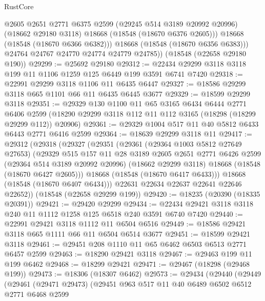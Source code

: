 \begin{lexlean}{RustCore}
\begin{coremodule}
              @2605
              @2651
              @2771
              @6375
              @2599
              (@29245 @514 @3189 @20992 @20996)
              (@18662 @29180 @3118)
              @18668
              (@18548 (@18670 @6376 @2605)))
            @18668
            (@18548 (@18670 @6366 @6382)))
          @18668
          (@18548 (@18670 @6356 @6383)))
        @24764
        @24767
        @24770
        @24774
        @24779
        @24785))
    (@18548 (@22658 @29180 @190))
@29299 := @25692 @29180
@29312 := @22434 @29299 @3118 @3118 @199 @11 @1106 @1259 @125 @6449 @199 @3591 @6741 @7420
@29318 := @22991 @29299 @3118 @1106 @11 @6435 @6447
@29327 := @18586 @29299 @3118 @665 @1101 @66 @11 @6435 @6445 @3677
@29329 := @18599 @29299 @3118
@29351 := @29329
    @130
    @1100
    @11
    @65
    @3165
    @6434
    @6444
    @2771
    @6406
    @2599
    (@18290 @29299 @3118 @112 @11 @112 @3165 (@18298 (@18299 @29299 @112)) @20906)
@29361 := @29329 @1004 @517 @11 @40 @5812 @6433 @6443 @2771 @6416 @2599
@29364 := @18639 @29299 @3118 @11
@29417 := @29312
    (@29318
      (@29327
        (@29351
          (@29361
            (@29364 @1003 @5812 @27649 @27653)
            (@29329
              @515
              @157
              @11
              @28
              @3189
              @2605
              @2651
              @2771
              @6426
              @2599
              (@29364 @514 @3189 @20992 @20996)
              (@18662 @29299 @3118)
              @18668
              (@18548 (@18670 @6427 @2605)))
            @18668
            (@18548 (@18670 @6417 @6433)))
          @18668
          (@18548 (@18670 @6407 @6434)))
        @22631
        @22634
        @22637
        @22641
        @22646
        @22652))
    (@18548 (@22658 @29299 @199))
@29420 := @18235 (@20390 (@18335 @20391))
@29421 := @29420 @29299
@29434 := @22434 @29421 @3118 @3118 @240 @11 @1112 @1258 @125 @6518 @240 @3591 @6740 @7420
@29440 := @22991 @29421 @3118 @1112 @11 @6504 @6516
@29449 := @18586 @29421 @3118 @665 @1111 @66 @11 @6504 @6514 @3677
@29451 := @18599 @29421 @3118
@29461 := @29451 @208 @1110 @11 @65 @6462 @6503 @6513 @2771 @6457 @2599
@29463 := @18290 @29421 @3118
@29467 := @29463 @199 @11 @199 @6462
@29468 := @18299 @29421
@29471 := @29467 (@18298 (@29468 @199))
@29473 := @18306 (@18307 @6462)
@29573 := @29434
    (@29440
      (@29449
        (@29461
          (@29471 @29473)
          (@29451
            @963
            @517
            @11
            @40
            @6489
            @6502
            @6512
            @2771
            @6468
            @2599

\end{coremodule}
\end{lexlean}
